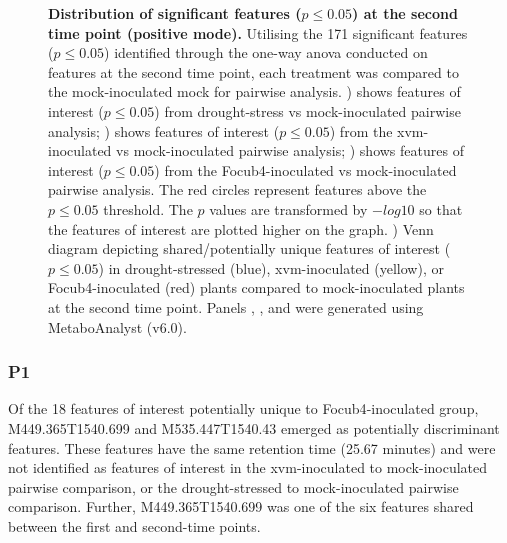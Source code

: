 \begin{figure}[hp!]
\begin{subfigure}[b]{0.47\textwidth}
        \caption{}
        \label{fig:PairwiseVenn-SecondTimePoint}
    \end{subfigure}
    \caption[Distribution of significant features at the second time point (positive mode).]{\textbf{Distribution of significant features ($p \le0.05$) at the second time point (positive mode).}
    Utilising the 171 significant features ($p \le0.05$) identified through the one-way \ac{anova} conducted on features at the second time point, each treatment was compared to the mock-inoculated mock for pairwise analysis.
    \textbf{}) shows features of interest ($p \le0.05$) from drought-stress vs mock-inoculated pairwise analysis;
    \textbf{}) shows features of interest ($p \le0.05$) from the \acl{xvm}-inoculated vs mock-inoculated pairwise analysis; 
    \textbf{}) shows features of interest ($p \le0.05$) from the \acl{Focub4}-inoculated vs mock-inoculated pairwise analysis. The red circles represent features above the $p \le0.05$ threshold. The $p$ values are transformed by $-log10$ so that the features of interest are plotted higher on the graph.
    \textbf{}) Venn diagram depicting shared/potentially unique features of interest ($p \le0.05$) in drought-stressed (blue), \ac{xvm}-inoculated (yellow), or \ac{Focub4}-inoculated (red) plants compared to mock-inoculated plants at the second time point. 
    Panels , , and  were generated using MetaboAnalyst (v6.0).  
    }
    \label{fig:enter-label}
\end{figure}

\subsubsection{P1}

Of the 18 features of interest potentially unique to \ac{Focub4}-inoculated group, M449.365T1540.699 and M535.447T1540.43 emerged as potentially discriminant features. These features have the same retention time (25.67 minutes) and were not identified as features of interest in the \ac{xvm}-inoculated to mock-inoculated pairwise comparison, or the drought-stressed to mock-inoculated pairwise comparison. Further, M449.365T1540.699 was one of the six features shared between the first and second-time points. 


